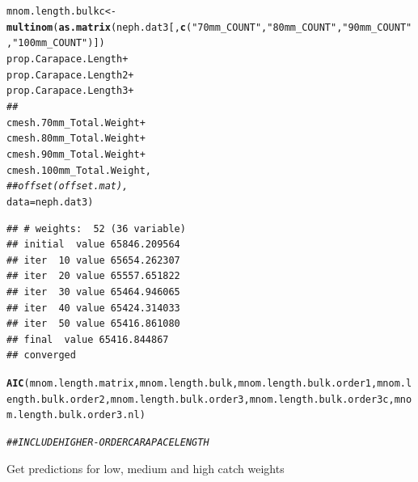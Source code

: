 \documentclass[12pt]{article}\usepackage[]{graphicx}\usepackage[]{color}
\makeatletter
\newcommand{\hlstr}[1]{\textcolor[rgb]{0.192,0.494,0.8}{#1}}%
\newcommand{\hlcom}[1]{\textcolor[rgb]{0.678,0.584,0.686}{\textit{#1}}}%
\newcommand{\hlopt}[1]{\textcolor[rgb]{0,0,0}{#1}}%
\newcommand{\hlstd}[1]{\textcolor[rgb]{0.345,0.345,0.345}{#1}}%
\newcommand{\hlkwb}[1]{\textcolor[rgb]{0.69,0.353,0.396}{#1}}%
\newcommand{\hlkwc}[1]{\textcolor[rgb]{0.333,0.667,0.333}{#1}}%
\newcommand{\hlkwd}[1]{\textcolor[rgb]{0.737,0.353,0.396}{\textbf{#1}}}%
\newenvironment{kframe}{%
 \def\at@end@of@kframe{}%
 \ifinner\ifhmode%
  \def\at@end@of@kframe{\end{minipage}}%
  \begin{minipage}{\columnwidth}%
 \fi\fi%
 \def\FrameCommand##1{\hskip\@totalleftmargin \hskip-\fboxsep
 \colorbox{shadecolor}{##1}\hskip-\fboxsep
     \hskip-\linewidth \hskip-\@totalleftmargin \hskip\columnwidth}%
 \MakeFramed {\advance\hsize-\width
   \@totalleftmargin\z@ \linewidth\hsize
   \@setminipage}}%
 {\par\unskip\endMakeFramed%
 \at@end@of@kframe}
\newenvironment{knitrout}{}{} %
\makeatother
\begin{document}
\begin{knitrout}
\begin{kframe}
\begin{alltt}
\hlstd{mnom.length.bulkc} \hlkwb{<-} \hlkwd{multinom}\hlstd{(}\hlkwd{as.matrix}\hlstd{(neph.dat3[,} \hlkwd{c}\hlstd{(}\hlstr{"70mm_COUNT"}\hlstd{,} \hlstr{"80mm_COUNT"}\hlstd{,} \hlstr{"90mm_COUNT"}\hlstd{,} \hlstr{"100mm_COUNT"}\hlstd{)])} \hlopt{~}
                              \hlstd{prop.Carapace.Length} \hlopt{+}
                              \hlstd{prop.Carapace.Length2} \hlopt{+}
                              \hlstd{prop.Carapace.Length3} \hlopt{+}
                              \hlcom{##}
                              \hlstd{cmesh.70mm_Total.Weight} \hlopt{+}
                              \hlstd{cmesh.80mm_Total.Weight} \hlopt{+}
                              \hlstd{cmesh.90mm_Total.Weight} \hlopt{+}
                              \hlstd{cmesh.100mm_Total.Weight,}
                              \hlcom{##offset(offset.mat),}
                              \hlkwc{data} \hlstd{= neph.dat3)}
\end{alltt}
\begin{verbatim}
## # weights:  52 (36 variable)
## initial  value 65846.209564 
## iter  10 value 65654.262307
## iter  20 value 65557.651822
## iter  30 value 65464.946065
## iter  40 value 65424.314033
## iter  50 value 65416.861080
## final  value 65416.844867 
## converged
\end{verbatim}
\begin{alltt}
\hlkwd{AIC}\hlstd{(mnom.length.matrix, mnom.length.bulk, mnom.length.bulk.order1, mnom.length.bulk.order2, mnom.length.bulk.order3, mnom.length.bulk.order3c, mnom.length.bulk.order3.nl)}
\end{alltt}


{\ttfamily\noindent\bfseries\color{errorcolor}{\#\# Error in lapply(list(object, ...), ll): object 'mnom.length.bulk.order1' not found}}\begin{alltt}
\hlcom{## INCLUDE HIGHER-ORDER CARAPACE LENGTH}
\end{alltt}
\end{kframe}
\end{knitrout}

Get predictions for low, medium and high catch weights
\end{document}
